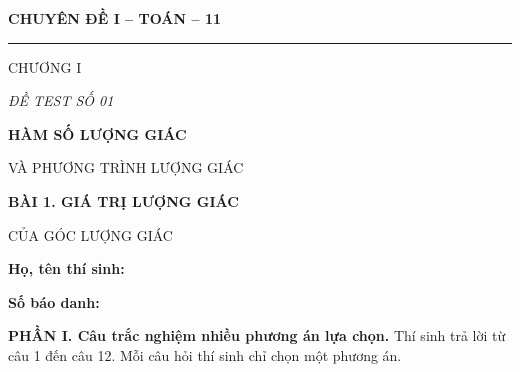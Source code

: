 \documentclass[12pt,a4paper]{article}
\begin{document}
\noindent
\begin{minipage}[t]{.35\textwidth}
  \centering
  {\bfseries CHUYÊN ĐỀ I -- TOÁN -- 11\par}
  \vspace{2pt}
  \rule{.72\linewidth}{.4pt}\par
  \vspace{3pt}
  CHƯƠNG I\par
  \vspace{4pt}
  {\itshape ĐỀ TEST SỐ 01\par}
\end{minipage}\hfill
\begin{minipage}[t]{.62\textwidth}
  \centering
  {\bfseries HÀM SỐ LƯỢNG GIÁC\par
  VÀ PHƯƠNG TRÌNH LƯỢNG GIÁC\par}
  \vspace{5pt}
  {\small\bfseries BÀI 1. GIÁ TRỊ LƯỢNG GIÁC\par
  CỦA GÓC LƯỢNG GIÁC\par}
\end{minipage}

\vspace{7mm}
\noindent
\begin{minipage}[t]{.72\textwidth}
  \textbf{Họ, tên thí sinh:}\dotfill\par
  \vspace{3pt}
  \textbf{Số báo danh:}\dotfill
\end{minipage}\hfill
\begin{minipage}[t]{.25\textwidth}
  \raggedleft
  \setlength{\fboxsep}{4pt}
\end{minipage}

\vspace{5mm}
\textbf{PHẦN I. Câu trắc nghiệm nhiều phương án lựa chọn.} Thí sinh trả lời từ câu 1 đến câu 12. Mỗi câu hỏi thí sinh chỉ chọn một phương án.
\end{document}
